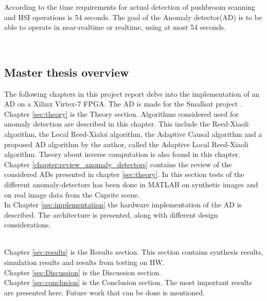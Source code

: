 According to \cite{SmallSat_project_description} the time requirements for actual detection of pushbroom scanning and HSI operations is 54 seconds. The goal of the Anomaly detector(AD) is to be able to operate in near-realtime or realtime, using at most 54 seconds. 

\\





\newpage
\subsection{Master thesis overview}
The following chapters in this project report delve into the implementation of an AD on a Xilinx Virtex-7 FPGA. The AD is made for the Smallsat project \cite{SmallSat_project_description}. \\  

Chapter \ref{sec:theory} is the Theory section.  Algorithms considered used for anomaly detection are described in this chapter. This include the Reed-Xiaoli algorithm, the Local Reed-Xialoi algorithm, the Adaptive Causal algorithm and a proposed AD algorithm by the author, called the Adaptive Local Reed-Xiaoli algorithm. Theory about inverse computation is also found in this chapter.   \\


Chapter \ref{chapter:review_anomaly_detectors} contains the review of the considered ADs presented in chapter \ref{sec:theory}. In this section tests of the different anomaly-detectors has been done in MATLAB on synthetic images and on real image data from the Cuprite scene.\\  

In Chapter \ref{sec:implementation} the hardware implementation of the AD is described. The architecture is presented, along with different design considerations. 

\\

Chapter \ref{sec:results} is the Results section. This section contains synthesis results, simulation results and results from testing on HW.
\\

Chapter \ref{sec:Discussion} is the Discussion section. 
\\

Chapter \ref{sec:conclusion} is the Conclusion section. The most important results are presented here.  Future work that can be done is mentioned.
\\




